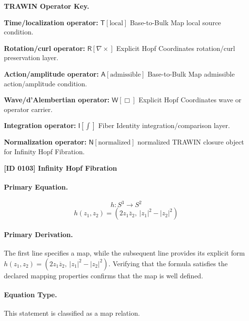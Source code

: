 \par\vspace{0.45\baselineskip}
\noindent\begin{minipage}[t]{\linewidth}
\begingroup
\small
\raggedright
\textbf{TRAWIN Operator Key.}\par
\noindent\textbf{Time/localization operator:} $\mathsf{T}\!\left[\mathrm{local}\right]$ Base-to-Bulk Map local source condition.\par
\noindent\textbf{Rotation/curl operator:} $\mathsf{R}\!\left[\nabla\times\right]$ Explicit Hopf Coordinates rotation/curl preservation layer.\par
\noindent\textbf{Action/amplitude operator:} $\mathsf{A}\!\left[\mathrm{admissible}\right]$ Base-to-Bulk Map admissible action/amplitude condition.\par
\noindent\textbf{Wave/d'Alembertian operator:} $\mathsf{W}\!\left[\Box\right]$ Explicit Hopf Coordinates wave or operator carrier.\par
\noindent\textbf{Integration operator:} $\mathsf{I}\!\left[\int\right]$ Fiber Identity integration/comparison layer.\par
\noindent\textbf{Normalization operator:} $\mathsf{N}\!\left[\mathrm{normalized}\right]$ normalized TRAWIN closure object for Infinity Hopf Fibration.\par
\endgroup
\end{minipage}

\clearpage
\noindent\textbf{[ID 0103] Infinity Hopf Fibration}\par
\vspace{0.35em}
\paragraph{Primary Equation.}
\[
h : S^3 \longrightarrow S^2
\]
\[
h(z_1,z_2)=\left(2 z_1 \overline{z}_2,\ \lvert z_1\rvert^2-\lvert z_2\rvert^2\right)
\]

\paragraph{Primary Derivation.}
The first line specifies a map, while the subsequent line provides its explicit form \( h(z_1,z_2)=\left(2 z_1 \overline{z}_2,\ \lvert z_1\rvert^2-\lvert z_2\rvert^2\right) \). Verifying that the formula satisfies the declared mapping properties confirms that the map is well defined.
\paragraph{Equation Type.}
This statement is classified as a map relation.

